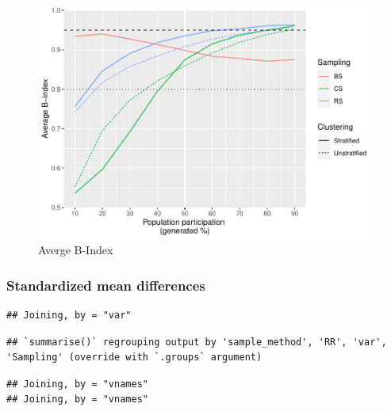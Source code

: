 \documentclass[
  english,
  man,floatsintext]{apa6}
\begin{document}
\begin{figure}
\centering
\includegraphics{5---Analysis_files/figure-latex/unnamed-chunk-13-1.pdf}
\caption{\label{fig:unnamed-chunk-13}Averge B-Index}
\end{figure}

\hypertarget{standardized-mean-differences}{%
\subsubsection{Standardized mean differences}\label{standardized-mean-differences}}

\begin{verbatim}
## Joining, by = "var"
\end{verbatim}

\begin{verbatim}
## `summarise()` regrouping output by 'sample_method', 'RR', 'var', 'Sampling' (override with `.groups` argument)
\end{verbatim}

\begin{verbatim}
## Joining, by = "vnames"
## Joining, by = "vnames"
\end{verbatim}
\end{document}
